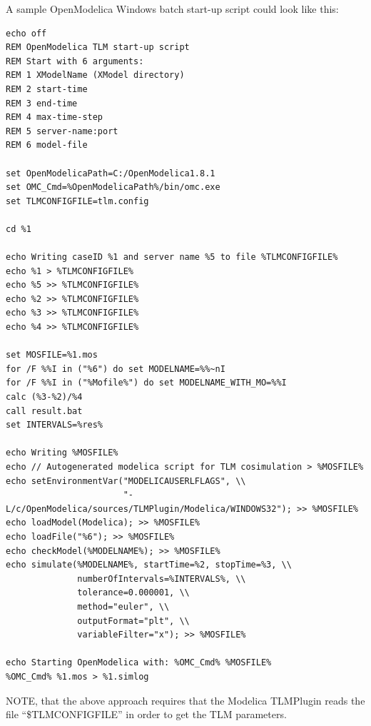 A sample OpenModelica Windows batch start-up script could look like this:
{\scriptsize
\begin{verbatim}
echo off
REM OpenModelica TLM start-up script
REM Start with 6 arguments:
REM 1 XModelName (XModel directory)
REM 2 start-time
REM 3 end-time
REM 4 max-time-step
REM 5 server-name:port
REM 6 model-file

set OpenModelicaPath=C:/OpenModelica1.8.1
set OMC_Cmd=%OpenModelicaPath%/bin/omc.exe
set TLMCONFIGFILE=tlm.config

cd %1

echo Writing caseID %1 and server name %5 to file %TLMCONFIGFILE%
echo %1 > %TLMCONFIGFILE%
echo %5 >> %TLMCONFIGFILE%
echo %2 >> %TLMCONFIGFILE%
echo %3 >> %TLMCONFIGFILE%
echo %4 >> %TLMCONFIGFILE%

set MOSFILE=%1.mos
for /F %%I in ("%6") do set MODELNAME=%%~nI
for /F %%I in ("%Mofile%") do set MODELNAME_WITH_MO=%%I
calc (%3-%2)/%4
call result.bat
set INTERVALS=%res%

echo Writing %MOSFILE%
echo // Autogenerated modelica script for TLM cosimulation > %MOSFILE%
echo setEnvironmentVar("MODELICAUSERLFLAGS", \\
                       "-L/c/OpenModelica/sources/TLMPlugin/Modelica/WINDOWS32"); >> %MOSFILE%
echo loadModel(Modelica); >> %MOSFILE%
echo loadFile("%6"); >> %MOSFILE%
echo checkModel(%MODELNAME%); >> %MOSFILE%
echo simulate(%MODELNAME%, startTime=%2, stopTime=%3, \\
              numberOfIntervals=%INTERVALS%, \\
              tolerance=0.000001, \\
              method="euler", \\
              outputFormat="plt", \\
              variableFilter="x"); >> %MOSFILE%

echo Starting OpenModelica with: %OMC_Cmd% %MOSFILE%
%OMC_Cmd% %1.mos > %1.simlog
\end{verbatim}
}

NOTE, that the above approach requires that the Modelica TLMPlugin
reads the file ``\$TLMCONFIGFILE'' in order to get the TLM parameters.

